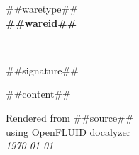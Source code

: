 \documentclass{##docstyle##}
\begin{document}
\begin{center}
  {##waretype##}\\
  \vspace{0.8em}
  {\huge \bfseries ##wareid##}\\
\end{center}\\
\vspace{1.5em}

##signature##

\vspace{1.5em}

\begin{multicols}{2}
##content##
\end{multicols}

\vspace{3em}

\begin{small}
\begin{flushright}Rendered from ##source##\\
using OpenFLUID docalyzer\\
\textit{\today}
\end{flushright}
\end{small}
\end{document}
